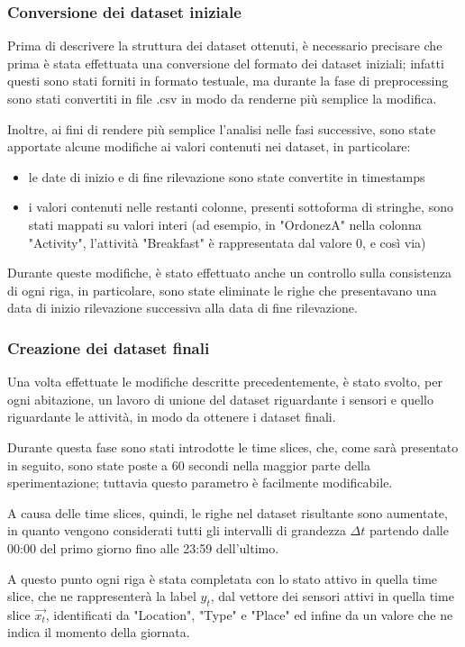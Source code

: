 \documentclass[10pt,a4paper]{article}
\begin{document}
\subsubsection{Conversione dei dataset iniziale}
Prima di descrivere la struttura dei dataset ottenuti, è necessario precisare che prima è stata effettuata una conversione del formato dei dataset iniziali; infatti questi sono stati forniti in formato testuale, ma durante la fase di preprocessing sono stati convertiti in file .csv in modo da renderne più semplice la modifica.

Inoltre, ai fini di rendere più semplice l'analisi nelle fasi successive, sono state apportate alcune modifiche ai valori contenuti nei dataset, in particolare:
\begin{itemize}
	\item le date di inizio e di fine rilevazione sono state convertite in timestamps
	\item i valori contenuti nelle restanti colonne, presenti sottoforma di stringhe, sono stati mappati su valori interi
	(ad esempio, in "OrdonezA" nella colonna "Activity", l'attività "Breakfast" è rappresentata dal valore 0, e così via)
\end{itemize}

Durante queste modifiche, è stato effettuato anche un controllo sulla consistenza di ogni riga, in particolare, sono state eliminate le righe che presentavano una data di inizio rilevazione successiva alla data di fine rilevazione.

\subsubsection{Creazione dei dataset finali}
Una volta effettuate le modifiche descritte precedentemente, è stato svolto, per ogni abitazione, un lavoro di unione del dataset riguardante i sensori e quello riguardante le attività, in modo da ottenere i dataset finali.

Durante questa fase sono stati introdotte le time slices, che, come sarà presentato in seguito, sono state poste a 60 secondi nella maggior parte della sperimentazione; tuttavia questo parametro è facilmente modificabile.

A causa delle time slices, quindi, le righe nel dataset risultante sono aumentate, in quanto vengono considerati tutti gli intervalli di grandezza $ \Delta t $ partendo dalle 00:00 del primo giorno fino alle 23:59 dell'ultimo.

A questo punto ogni riga è stata completata con lo stato attivo in quella time slice, che ne rappresenterà la label $ y_{t} $, dal vettore dei sensori attivi in quella time slice $  \vec{x_{t}} $, identificati da "Location", "Type" e "Place" ed infine da un valore che ne indica il momento della giornata.
\end{document}
